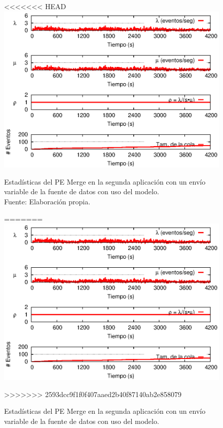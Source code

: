 \begin{figure}[!ht]
<<<<<<< HEAD
    \centering
    \captionsetup{justification=centering}
    \includegraphics[scale=1]{images/exp/app2/normal/cm/statusMergePE.eps}
    \caption[Estadísticas del PE Merge en la segunda aplicación con un envío variable de la fuente de datos con uso del modelo.]{Estadísticas del PE Merge en la segunda aplicación con un envío variable de la fuente de datos con uso del modelo.\\Fuente: Elaboración propia.}
=======
\centering
    \includegraphics[scale=1.1]{images/exp/app2/normal/cm/statusMergePE.eps}
    \caption{Estad\'isticas del PE Merge en la segunda aplicaci\'on con un env\'io variable de la fuente de datos con uso del modelo.}
>>>>>>> 2593dcc9f1f0f407aaed2b40f87140ab2e858079
    \label{fig:app2-normal-statusMergePE-cm}
\end{figure}

